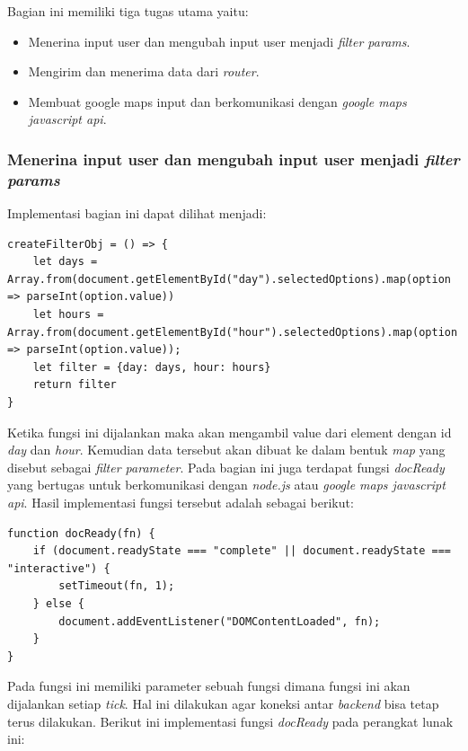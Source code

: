 Bagian ini memiliki tiga tugas utama yaitu:
\begin{itemize}
    \item Menerina input user dan mengubah input user menjadi \textit{filter params}.
    \item Mengirim dan menerima data dari \textit{router}.
    \item Membuat google maps input dan berkomunikasi dengan \textit{google maps javascript api}.
\end{itemize}

\subsubsection{ Menerina input user dan mengubah input user menjadi \textit{filter params}}
Implementasi bagian ini dapat dilihat menjadi:
\begin{lstlisting}[label=input_user , caption=Input User]
createFilterObj = () => {
    let days = Array.from(document.getElementById("day").selectedOptions).map(option => parseInt(option.value))
    let hours = Array.from(document.getElementById("hour").selectedOptions).map(option => parseInt(option.value));
    let filter = {day: days, hour: hours}
    return filter
}

\end{lstlisting}

Ketika fungsi ini dijalankan maka akan mengambil value dari element dengan id \textit{day} dan \textit{hour}. Kemudian data tersebut akan dibuat ke dalam bentuk \textit{map} yang disebut sebagai \textit{filter parameter}. Pada bagian ini juga terdapat fungsi \textit{docReady} yang bertugas untuk  berkomunikasi dengan \textit{node.js} atau \textit{google maps javascript api}. Hasil implementasi fungsi tersebut adalah sebagai berikut:
\begin{lstlisting}[label=docReady , caption=docReady Method]
function docReady(fn) {
    if (document.readyState === "complete" || document.readyState === "interactive") {
        setTimeout(fn, 1);
    } else {
        document.addEventListener("DOMContentLoaded", fn);
    }
}

\end{lstlisting}
Pada fungsi ini memiliki parameter sebuah fungsi dimana fungsi ini akan dijalankan setiap \textit{tick}. Hal ini dilakukan agar koneksi antar \textit{backend} bisa tetap terus dilakukan. Berikut ini implementasi fungsi \textit{docReady} pada perangkat lunak ini:

